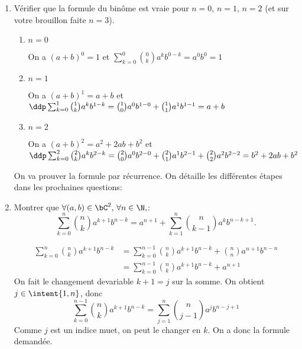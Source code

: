 \begin{correction}



\begin{enumerate}

\item Vérifier que la formule du binôme est vraie pour $n=0$, $n=1$, $n=2$ (et sur votre brouillon faite $n=3$).



\begin{enumerate}
\item $n=0$

On a 
$(a+b)^0 =1$ et 
$\sum_{k=0}^0 \binom{0}{k}a^k b^{0-k} = a^0b^0=1$

\item $n=1$

On a 
$(a+b)^1 =a+b$ et 
$\ddp \sum_{k=0}^1 \binom{1}{k}a^k b^{1-k} = \binom{1}{0}a^0 b^{1-0}+\binom{1}{1}a^1 b^{1-1}= a+b$


\item $n=2$

On a 
$(a+b)^2 =a^2+2ab+b^2$ et 
$\ddp \sum_{k=0}^2 \binom{2}{k}a^k b^{2-k} = \binom{2}{0}a^0 b^{2-0}+\binom{2}{1}a^1 b^{2-1}+\binom{2}{2}a^2 b^{2-2} =b^2+2ab+b^2$


\end{enumerate}
 









On va prouver la formule par récurrence. On détaille les différentes étapes dans les prochaines questions: 
\item Montrer que $\forall (a,b)\in \bC^2,\,  \forall n \in \N, $:
$$\sum_{k=0}^n \binom{n}{k}a^{k+1} b^{n-k} = a^{n+1}+\sum_{k=1}^{n} \binom{n}{k-1}a^{k} b^{n-k+1}.$$


\begin{align*}
\sum_{k=0}^n \binom{n}{k}a^{k+1} b^{n-k}  &= \sum_{k=0}^{n-1} \binom{n}{k}a^{k+1} b^{n-k}  + \binom{n}{n}a^{n+1} b^{n-n} \\
&= \sum_{k=0}^{n-1} \binom{n}{k}a^{k+1} b^{n-k}  + a^{n+1} 
\end{align*}
On fait le changement devariable $k+1=j$ sur la somme. On obtient 
$j\in \intent{1,n}$, donc 
$$\sum_{k=0}^{n-1} \binom{n}{k}a^{k+1} b^{n-k}  = \sum_{j=1}^{n} \binom{n}{j-1}a^{j} b^{n-j+1} $$
Comme $j$ est un indice muet, on peut le changer en $k$. On a donc la formule demandée.





\end{enumerate}
\end{correction}
